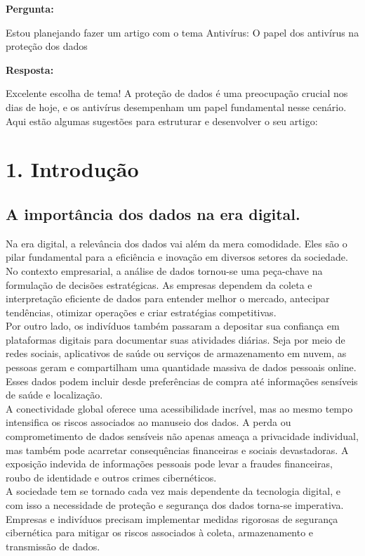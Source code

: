 \documentclass[10pt,conference,twocolumn]{article}
\begin{document}
\textbf{Pergunta:}\newline

Estou planejando fazer um artigo com o tema Antivírus: O papel dos antivírus na proteção dos dados\newline

\textbf{Resposta:}\newline

Excelente escolha de tema! A proteção de dados é uma preocupação crucial nos dias de hoje, e os antivírus desempenham um papel fundamental nesse cenário. Aqui estão algumas sugestões para estruturar e desenvolver o seu artigo:

\section* {1. Introdução}

\subsection*{A importância dos dados na era digital.}
Na era digital, a relevância dos dados vai além da mera comodidade. Eles são o pilar fundamental para a eficiência e inovação em diversos setores da sociedade. No contexto empresarial, a análise de dados tornou-se uma peça-chave na formulação de decisões estratégicas. As empresas dependem da coleta e interpretação eficiente de dados para entender melhor o mercado, antecipar tendências, otimizar operações e criar estratégias competitivas.\\
Por outro lado, os indivíduos também passaram a depositar sua confiança em plataformas digitais para documentar suas atividades diárias. Seja por meio de redes sociais, aplicativos de saúde ou serviços de armazenamento em nuvem, as pessoas geram e compartilham uma quantidade massiva de dados pessoais online. Esses dados podem incluir desde preferências de compra até informações sensíveis de saúde e localização.\\
A conectividade global oferece uma acessibilidade incrível, mas ao mesmo tempo intensifica os riscos associados ao manuseio dos dados. A perda ou comprometimento de dados sensíveis não apenas ameaça a privacidade individual, mas também pode acarretar consequências financeiras e sociais devastadoras. A exposição indevida de informações pessoais pode levar a fraudes financeiras, roubo de identidade e outros crimes cibernéticos.\\
A sociedade tem se tornado cada vez mais dependente da tecnologia digital, e com isso a necessidade de proteção e segurança dos dados torna-se imperativa. Empresas e indivíduos precisam implementar medidas rigorosas de segurança cibernética para mitigar os riscos associados à coleta, armazenamento e transmissão de dados.
\end{document}
